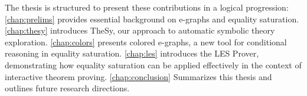 The thesis is structured to present these contributions in a logical progression:
\autoref{chap:prelims} provides essential background on e-graphs and equality saturation.
\autoref{chap:thesy} introduces TheSy, our approach to automatic symbolic theory exploration.
\autoref{chap:colors} presents colored e-graphs, a new tool for conditional reasoning in equality saturation.
\autoref{chap:les} introduces the LES Prover, demonstrating how equality saturation can be applied effectively in the context of interactive theorem proving.
\autoref{chap:conclusion} Summarizes this thesis and outlines future research directions.

\begin{comment}
Please note that the \texttt{iitthesis} class has several options when you use it, such as:
\begin{itemize}
\item \texttt{fullpageDraft} to avoid the margins necessary for proper binding when you make the final print
\item \texttt{beforeDefense} makes the personal acknowledgements invisible; use this to print the copies you submit initially to the grad school for sending to the opponent panel, i.e. thesis readers (who shouldn't see those parts). For the final submission, after having successfully defended --- drop this option. 
\item \texttt{noabbrevs} no notation \& abbreviations list will be included in the thesis.
\end{itemize}

\subsection*{Hebrew font}

The \texttt{iitthesis} document class uses the David CLM font family for Hebrew text. CLM is a shorthand for ``Culmus'' (\texthebrew{קולמוס}) --- the name of a freely-available Hebrew font package. It may be bundled with your LaTeX distribution, or otherwise, must be available as system fonts. If you're missing the Culmus fonts, try adding an appropriate package from your LaTeX distribution or system distribution; alternatively, you might want to visit the Culmus project page at \url{http://culmus.sourceforge.net/} and download and install the fonts manually.    

\subsection*{Setting thesis meta-data and publication information}


\end{comment}
